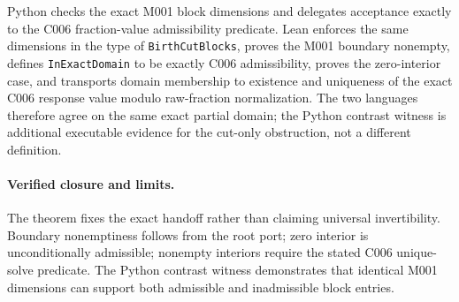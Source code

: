 Python checks the exact M001 block dimensions and delegates acceptance exactly
to the C006 fraction-value admissibility predicate.  Lean enforces the same dimensions
in the type of \texttt{BirthCutBlocks}, proves the M001 boundary nonempty,
defines \texttt{InExactDomain} to be exactly C006 admissibility, proves the
zero-interior case, and transports domain membership to existence and uniqueness of the exact C006 response value modulo raw-fraction normalization.  The two languages therefore agree on the same exact
partial domain; the Python contrast witness is additional executable evidence
for the cut-only obstruction, not a different definition.

\paragraph*{Verified closure and limits.}
The theorem fixes the exact handoff rather than claiming universal
invertibility.  Boundary nonemptiness follows from the root port; zero
interior is unconditionally admissible; nonempty interiors require the stated
C006 unique-solve predicate.  The Python contrast witness demonstrates that
identical M001 dimensions can support both admissible and inadmissible block
entries.
